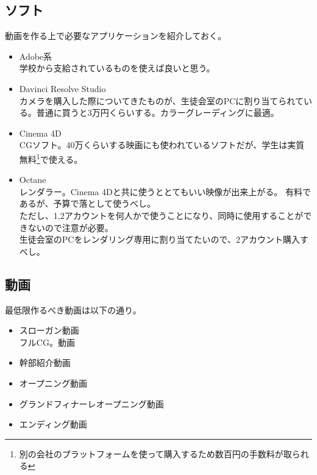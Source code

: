 \documentclass[dvipdfmx,11pt]{jarticle}
\begin{document}
\subsection{ソフト}
 動画を作る上で必要なアプリケーションを紹介しておく。
 \begin{itemize}
  \item Adobe系\\
  学校から支給されているものを使えば良いと思う。
  \item Davinci Resolve Studio\\
  カメラを購入した際についてきたものが、生徒会室のPCに割り当てられている。普通に買うと3万円くらいする。カラーグレーディングに最適。
  \item Cinema 4D\\
  CGソフト。40万くらいする映画にも使われているソフトだが、学生は実質無料\footnote{別の会社のプラットフォームを使って購入するため数百円の手数料が取られる}で使える。
  \item Octane\\
  レンダラー。Cinema 4Dと共に使うととてもいい映像が出来上がる。
  有料であるが、予算で落として使うべし。\\ただし、1,2アカウントを何人かで使うことになり、同時に使用することができないので注意が必要。\\生徒会室のPCをレンダリング専用に割り当てたいので、2アカウント購入すべし。
 \end{itemize}
\subsection{動画}
最低限作るべき動画は以下の通り。
 \begin{itemize}
  \item スローガン動画\\
  フルCG。動画
  \item 幹部紹介動画
  \item オープニング動画
  \item グランドフィナーレオープニング動画
  \item エンディング動画
 \end{itemize}
\end{document}
